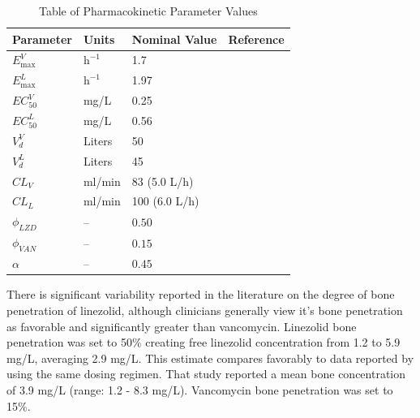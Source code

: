 \documentclass[utf8]{FrontiersinHarvard} %
\begin{document}
\begin{table}[H]
\centering
\renewcommand{\arraystretch}{1.35}
\caption{Table of Pharmacokinetic Parameter Values}\label{tab:PKparams}
\vspace{0.3cm}
\begin{tabular}{l l l l}
\hline
\textbf{Parameter} & \textbf{Units} & \textbf{Nominal Value} & \textbf{Reference} \\
\hline
$E_{\max}^{V}$ & $\mathrm{h^{-1}}$ & 1.7 & \citealp{VeraYunca2025}\\
$E_{\max}^{L}$ & $\mathrm{h^{-1}}$ & 1.97 & \citealp{VeraYunca2025}\\
$EC_{50}^{V}$ & mg/L & 0.25 & \citealp{VeraYunca2025}\\
$EC_{50}^{L}$ & mg/L & 0.56 & \citealp{VeraYunca2025}\\
$V_d^{V}$ & Liters & 50 & \citealp{Matzke1986} \\
$V_d^{L}$ & Liters & 45  &  \citealp{dryden2011linezolid} \\
$CL_{V}$ & ml/min & 83 (5.0 L/h) & \citealp{Matzke1986} \\
$CL_{L}$ & ml/min & 100 (6.0 L/h) & \citealp{dryden2011linezolid} \\
$\phi_{LZD}$           & --                  & $0.50$              & \citealp{dryden2011linezolid,kutschalissberg2003linezolid} \\
$\phi_{VAN}$           & --                  & $0.15$              & \citealp{MomoduSavaliya2023,spellberg2012systemic} \\
$\alpha$               & --                  & $0.45$              & \citealp{VeraYunca2025} \\
\hline
\end{tabular}
\end{table}

There is significant variability reported in the literature on the degree of bone penetration of linezolid,
although clinicians generally view it's bone penetration as favorable and significantly greater than vancomycin.
Linezolid bone penetration was set to 50\% creating free linezolid concentration from 1.2 to 5.9 mg/L, averaging 2.9 mg/L.
This estimate compares favorably
to data reported by \citet{kutschalissberg2003linezolid} using the same dosing regimen.  That study reported a mean bone
concentration of 3.9 mg/L (range: 1.2 - 8.3 mg/L).
Vancomycin bone penetration was set to 15\%.
\end{document}
